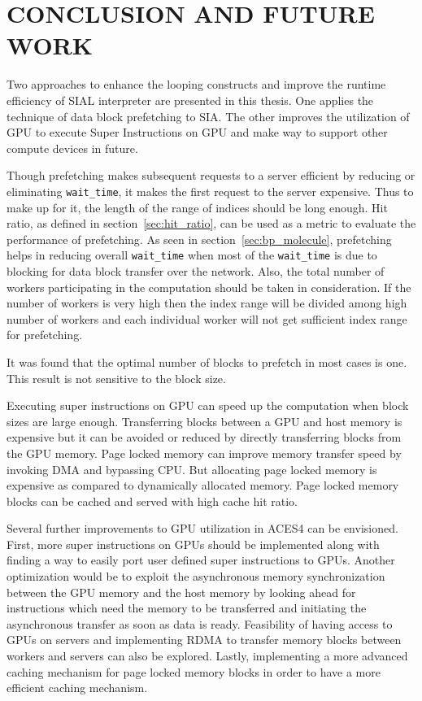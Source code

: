 \chapter{CONCLUSION AND FUTURE WORK}\label{conclusion}
Two approaches to enhance the looping constructs and improve the runtime efficiency
of SIAL interpreter are presented in this thesis. One applies the technique of
data block prefetching to SIA. The other improves
the utilization of GPU to execute Super Instructions on GPU and make way to support
other compute devices in future.

Though prefetching makes subsequent requests to a server efficient by reducing or
eliminating \texttt{wait\_time}, it makes the first request to the server expensive.
Thus to make up for it, the length of the range of indices should be long enough. Hit
ratio, as defined in section~\ref{sec:hit_ratio}, can be used as a metric to evaluate
the performance of prefetching. As seen in section~\ref{sec:bp_molecule}, prefetching
helps in reducing overall \texttt{wait\_time} when most of the \texttt{wait\_time}
is due to blocking for data block transfer over the network. Also, the total number
of workers participating in the computation should be taken in consideration.
If the number of workers is very high then the index range will be divided among high number
of workers and each individual worker will not get sufficient index range for prefetching.

It was found that the optimal number of blocks to prefetch in most cases is one.
This result is not sensitive to the block size.

Executing super instructions on GPU can speed up the computation when block sizes
are large enough. Transferring blocks between a GPU and host memory is expensive but it can be
avoided or reduced by directly transferring blocks from the GPU memory.
Page locked memory
can improve memory transfer speed by invoking DMA and bypassing CPU. But allocating page locked
memory is expensive as compared to dynamically allocated memory. Page locked
memory blocks can be cached and served with high cache hit ratio.

Several further improvements to GPU utilization in ACES4 can be envisioned. First,
more super instructions on GPUs should be implemented along with finding a way to
easily port user defined super instructions to GPUs. Another optimization would be
to exploit the asynchronous memory synchronization between the GPU memory
and the host memory by looking ahead for instructions which need the memory
to be transferred and initiating the asynchronous transfer as soon as data is ready.
Feasibility of having access to GPUs on servers and implementing
RDMA to transfer memory blocks between workers and servers can also be explored. Lastly, implementing
a more advanced caching mechanism for page locked memory blocks in order to have a
more efficient caching mechanism.
